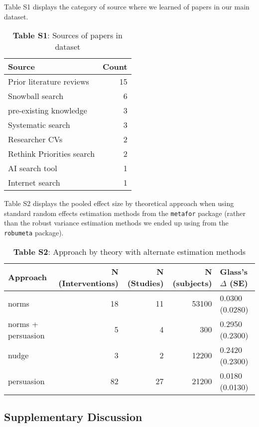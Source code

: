 \documentclass[sn-nature,pdflatex]{sn-jnl}
\begin{document}
Table S1 displays the category of source where we learned of papers in
our main dataset. \captionsetup[table]{labelformat=empty}

\begin{table}[!h]
\centering
\caption{\label{tab:supp_table_one}\textbf{Table S1}: Sources of papers in dataset}
\centering
\begin{tabular}[t]{lr}
\toprule
Source & Count\\
\midrule
Prior literature reviews & 15\\
Snowball search & 6\\
pre-existing knowledge & 3\\
Systematic search & 3\\
Researcher CVs & 2\\
\addlinespace
Rethink Priorities search & 2\\
AI search tool & 1\\
Internet search & 1\\
\bottomrule
\end{tabular}
\end{table}

Table S2 displays the pooled effect size by theoretical approach when
using standard random effects estimation methods from the
\texttt{metafor} package (rather than the robust variance estimation
methods we ended up using from the \texttt{robumeta} package).

\begin{table}[!h]
\centering
\caption{\label{tab:supp_table_two}\textbf{Table S2}: Approach by theory with alternate estimation methods }
\centering
\begin{tabular}[t]{lrrrl}
\toprule
Approach & N (Interventions) & N (Studies) & N (subjects) & Glass's $\Delta$ (SE)\\
\midrule
norms & 18 & 11 & 53100 & 0.0300 (0.0280)\\
norms + persuasion & 5 & 4 & 300 & 0.2950 (0.2300)\\
nudge & 3 & 2 & 12200 & 0.2420 (0.2300)\\
persuasion & 82 & 27 & 21200 & 0.0180 (0.0130)\\
\bottomrule
\end{tabular}
\end{table}

\subsection{Supplementary Discussion}\label{supplementary-discussion}
\end{document}
